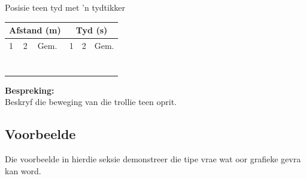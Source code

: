 \begin{f_experiment}{Posisie teen tyd met 'n tydtikker}
\begin{table}[H]
\begin{center}
      \label{m38795*id7141349}
      \begin{tabular}{|l|l|l|l|l|l|}\hline
    \multicolumn{3}{|c|}{Afstand (m)}
     &
    \multicolumn{3}{c|}{Tyd (s)}
     \\ \hline
        1 &
        2 &
        Gem. &
        1 &
        2 &
        Gem. \\ \hline
         &
         &
         &
         &
         &
      \\ \hline
         &
         &
         &
         &
         &
       \\ \hline
         &
         &
         &
         &
         &
       \\ \hline
         &
         &
         &
         &
         &
        \\ \hline
         &
         &
         &
         &
         &
        \\ \hline
         &
         &
         &
         &
         &
       \\ \hline
         &
         &
         &
         &
         &
      \\ \hline
    \end{tabular}
      \end{center}
\end{table}
    \par
\textbf{Bespreking:}\\
Beskryf die beweging van die trollie teen oprit.
\end{f_experiment}
\par \label{m38795*cid9}


\subsection*{Voorbeelde}
            \nopagebreak
Die voorbeelde in hierdie seksie demonstreer die tipe vrae wat oor grafieke gevra kan word. 

